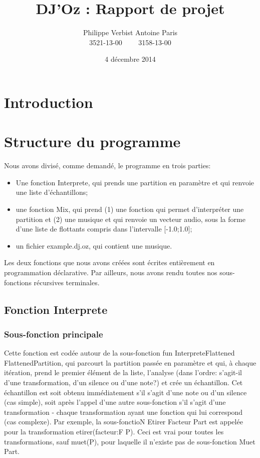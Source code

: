 \documentclass[12pt,a4paper]{article}
\author{Philippe Verbist  Antoine Paris\\3521-13-00 \ \ \ \ 3158-13-00}
\title{DJ'Oz : Rapport de projet}
\date{4 décembre 2014}
\begin{document}
\maketitle

\section{Introduction}

\section{Structure du programme}
Nous avons divisé, comme demandé, le programme en trois parties:
\begin{itemize}
	\item Une fonction Interprete, qui prends une partition en 	paramètre et qui renvoie une liste d'échantillons;
	\item une fonction Mix, qui prend (1) une fonction qui permet d'interpréter une partition  et (2) une musique et qui renvoie un vecteur audio, sous la forme d'une liste de flottants compris dans l'intervalle [-1.0;1.0];
	\item un fichier example.dj.oz, qui contient une musique.
\end{itemize}

Les deux fonctions que nous avons créées sont écrites entièrement en programmation déclarative. Par ailleurs, nous avons rendu toutes nos sous-fonctions récursives terminales.

\subsection{Fonction Interprete}
\subsubsection{Sous-fonction principale}
Cette fonction est codée autour de la sous-fonction fun {InterpreteFlattened FlattenedPartition},
 qui parcourt la partition passée en paramètre et qui, à chaque itération, prend le premier
élément de la liste, l'analyse (dans l'ordre: s'agit-il d'une transformation, d'un silence ou d'une note?)
 et crée un échantillon. Cet échantillon est soit obtenu immédiatement s'il s'agit d'une note ou d'un
silence (cas simple), soit après l'appel d'une autre sous-fonction s'il s'agit d'une transformation -
chaque transformation ayant une fonction qui lui correspond (cas complexe). Par exemple, la sous-fonctioN
{Etirer Facteur Part} est appelée pour la transformation etirer(facteur:F P). Ceci est vrai pour toutes
les transformations, sauf muet(P), pour laquelle il n'existe pas de sous-fonction {Muet Part}.
\end{document}
